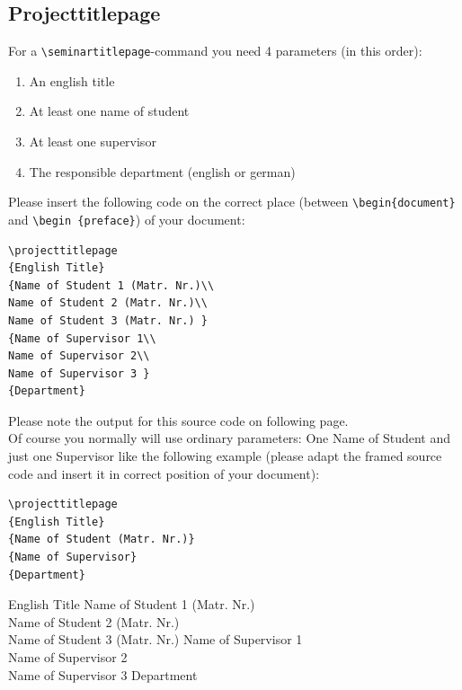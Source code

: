 \documentclass[ trackchanges, hyperref, pdf, mp, mppdf, en]{wise}
\newcommand\code[1]{\texttt{#1}}
\newcommand\command[1]{\code{\textbackslash{}#1}}
\begin{document}
\begin{appendix}
\begin{appendices}
\section{Projecttitlepage}

For a \command{seminartitlepage}-command you need 4 parameters (in this order): 

\begin{enumerate}
\item An english title
\item At least one name of student
\item At least one supervisor
\item The responsible department (english or german) 
\end{enumerate}

Please insert the following code on the correct place (between \command{begin\{document\} } and \command{begin \{preface\}}) of your document:

\lstlatex 

\begin{lstlisting}
\projecttitlepage
{English Title}
{Name of Student 1 (Matr. Nr.)\\
Name of Student 2 (Matr. Nr.)\\
Name of Student 3 (Matr. Nr.) }
{Name of Supervisor 1\\
Name of Supervisor 2\\ 
Name of Supervisor 3 }
{Department}
\end{lstlisting} 
Please note the output for this source code on following page. \\

Of course you normally will use ordinary parameters: One Name of Student and just one Supervisor like the following example (please adapt the framed source code and insert it in correct position of your document):
\lstlatex
\begin{lstlisting}
\projecttitlepage
{English Title}
{Name of Student (Matr. Nr.)}
{Name of Supervisor}
{Department}

\end{lstlisting}




\clearpage 

\projecttitlepage
{English Title}
{Name of Student 1 (Matr. Nr.)\\
Name of Student 2 (Matr. Nr.)\\
Name of Student 3 (Matr. Nr.) }
{Name of Supervisor 1\\
Name of Supervisor 2\\ 
Name of Supervisor 3 }
{Department}


\end{appendices}
\end{appendix}
\end{document}
